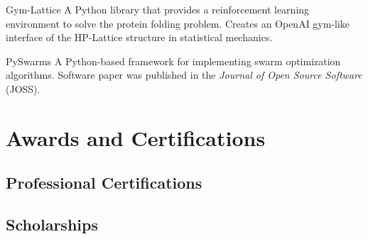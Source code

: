\documentclass[11pt,a4paper,sans]{moderncv}
\begin{document}
        {\color{blue} }
        {Gym-Lattice}{}{}
        {
        A Python library that provides a reinforcement learning environment
        to solve the protein folding problem. Creates an OpenAI gym-like
        interface of the HP-Lattice structure in statistical mechanics.
        }

        {\color{blue} }
        {PySwarms}{}{}
        {
        A Python-based framework for implementing swarm optimization
        algorithms. Software paper was published in the \textit{Journal of Open
        Source Software} (JOSS).
        }


\section{Awards and Certifications}

\subsection{Professional Certifications}

\subsection{Scholarships}


\nocite{*}


\end{document}
